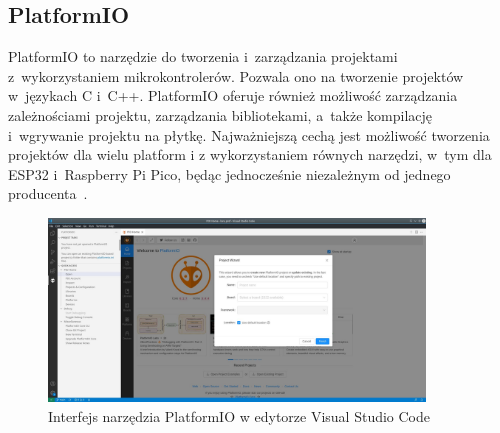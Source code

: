 \subsection{PlatformIO}
PlatformIO to narzędzie do tworzenia i~zarządzania projektami z~wykorzystaniem mikrokontrolerów.
Pozwala ono na tworzenie projektów w~językach C i~C++.
PlatformIO oferuje również możliwość zarządzania zależnościami projektu, zarządzania bibliotekami, a~także kompilację i~wgrywanie projektu na płytkę.
Najważniejszą cechą jest możliwość tworzenia projektów dla wielu platform i z wykorzystaniem równych narzędzi, w~tym dla ESP32 i~Raspberry Pi Pico, będąc jednocześnie niezależnym od jednego producenta~\cite{tool:pio}.

\begin{figure}[b!]
    \begin{center}
        \includegraphics[angle=90, width=10cm]{pic/pio.jpg}
    \end{center}
    \caption{Interfejs narzędzia PlatformIO w edytorze Visual Studio Code}\label{fig:pio}
\end{figure}

